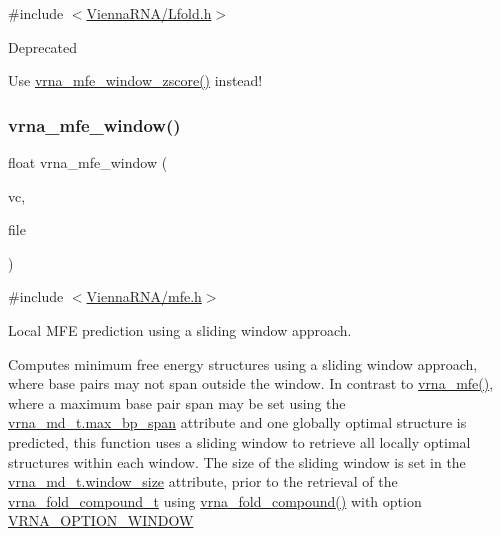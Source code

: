 {\ttfamily \#include $<$\hyperlink{Lfold_8h}{Vienna\+R\+N\+A/\+Lfold.\+h}$>$}

\begin{DoxyRefDesc}{Deprecated}
\item[\hyperlink{deprecated__deprecated000089}{Deprecated}]Use \hyperlink{group__local__mfe__fold_gaa4f67ae94efd08d800c17f9b53423fd6}{vrna\+\_\+mfe\+\_\+window\+\_\+zscore()} instead! \end{DoxyRefDesc}
\mbox{\label{group__local__mfe__fold_ga689df235a1915a1ad56e377383c044ce}} 
\subsubsection{\texorpdfstring{vrna\+\_\+mfe\+\_\+window()}{vrna\_mfe\_window()}}
{\footnotesize\ttfamily float vrna\+\_\+mfe\+\_\+window (\begin{DoxyParamCaption}\item[{\hyperlink{group__fold__compound_ga1b0cef17fd40466cef5968eaeeff6166}{vrna\+\_\+fold\+\_\+compound\+\_\+t} $\ast$}]{vc,  }\item[{F\+I\+LE $\ast$}]{file }\end{DoxyParamCaption})}



{\ttfamily \#include $<$\hyperlink{mfe_8h}{Vienna\+R\+N\+A/mfe.\+h}$>$}



Local M\+FE prediction using a sliding window approach. 

Computes minimum free energy structures using a sliding window approach, where base pairs may not span outside the window. In contrast to \hyperlink{group__mfe__fold_gabd3b147371ccf25c577f88bbbaf159fd}{vrna\+\_\+mfe()}, where a maximum base pair span may be set using the \hyperlink{group__model__details_a659e5fcc6e8c9f1a68e7de6548eef3b0}{vrna\+\_\+md\+\_\+t.\+max\+\_\+bp\+\_\+span} attribute and one globally optimal structure is predicted, this function uses a sliding window to retrieve all locally optimal structures within each window. The size of the sliding window is set in the \hyperlink{group__model__details_abea42f9229f8d8d6bcbedef316315bfc}{vrna\+\_\+md\+\_\+t.\+window\+\_\+size} attribute, prior to the retrieval of the \hyperlink{group__fold__compound_ga1b0cef17fd40466cef5968eaeeff6166}{vrna\+\_\+fold\+\_\+compound\+\_\+t} using \hyperlink{group__fold__compound_ga6601d994ba32b11511b36f68b08403be}{vrna\+\_\+fold\+\_\+compound()} with option \hyperlink{group__fold__compound_ga2b2a8009ccdccc3eb1571556261aee8e}{V\+R\+N\+A\+\_\+\+O\+P\+T\+I\+O\+N\+\_\+\+W\+I\+N\+D\+OW}

